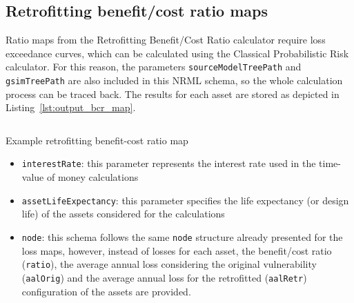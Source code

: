 \subsection{Retrofitting benefit/cost ratio maps}

Ratio maps from the Retrofitting Benefit/Cost Ratio calculator require loss
exceedance curves, which can be calculated using the Classical Probabilistic Risk
calculator. For this reason, the parameters \Verb+sourceModelTreePath+ and
\Verb+gsimTreePath+ are also included in this NRML schema, so the whole
calculation process can be traced back. The results for each \gls{asset} are
stored as depicted in Listing~\ref{lst:output_bcr_map}.

\begin{listing}[htbp]
  \inputminted[firstline=1,firstnumber=1,fontsize=\footnotesize,frame=single,bgcolor=lightgray]{xml}{oqum/risk/verbatim/output_bcr_map.xml}
  \caption{Example retrofitting benefit-cost ratio map}
  \label{lst:output_bcr_map}
\end{listing}


\begin{itemize}
  \item \Verb+interestRate+: this parameter represents the interest rate used
    in the time-value of money calculations

  \item \Verb+assetLifeExpectancy+: this parameter specifies the life expectancy
    (or design life) of the \glspl{asset} considered for the calculations

  \item \Verb+node+: this schema follows the same \Verb+node+ structure already
    presented for the loss maps, however, instead of losses for each
    \gls{asset}, the benefit/cost ratio (\Verb+ratio+), the average annual loss
    considering the original vulnerability (\Verb+aalOrig+) and the average
    annual loss for the retrofitted (\Verb+aalRetr+) configuration of the
    \glspl{asset} are provided.

\end{itemize}